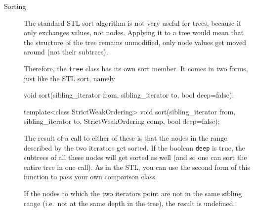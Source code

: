 \documentclass[11pt]{kasper}
\begin{document}
\begin{sectionunit}
\begin{sectionunit}
\begin{description}
\item[Sorting] The standard STL sort algorithm is not very useful for
trees, because it only exchanges values, not nodes. Applying it to a
tree would mean that the structure of the tree remains unmodified,
only node values get moved around (not their subtrees).

Therefore, the {\tt tree} class has its own sort member. It comes in
two forms, just like the STL sort, namely
\begin{screen}
void     sort(sibling_iterator from, sibling_iterator to, bool deep=false);

template<class StrictWeakOrdering>
void     sort(sibling_iterator from, sibling_iterator to,
              StrictWeakOrdering comp, bool deep=false);
\end{screen}
The result of a call to either of these is that the nodes in the range
described by the two iterators get sorted. If the boolean {\tt deep}
is true, the subtrees of all these nodes will get sorted as well (and
so one can sort the entire tree in one call).  As in the STL, you can
use the second form of this function to pass your own comparison
class.

If the nodes to which the two iterators point are not in the same
sibling range (i.e.~not at the same depth in the tree), the result is undefined.


\end{description}
\end{sectionunit}
\end{sectionunit}
\end{document}
